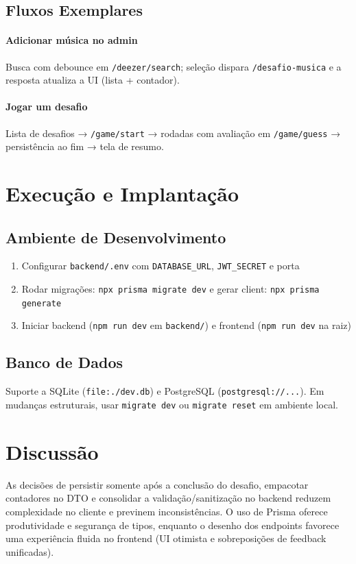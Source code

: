 \documentclass[12pt,a4paper]{article}
\begin{document}
\subsection{Fluxos Exemplares}
\paragraph{Adicionar música no admin} Busca com debounce em \texttt{/deezer/search}; seleção dispara \texttt{/desafio-musica} e a resposta atualiza a UI (lista + contador).

\paragraph{Jogar um desafio} Lista de desafios → \texttt{/game/start} → rodadas com avaliação em \texttt{/game/guess} → persistência ao fim → tela de resumo.

\section{Execução e Implantação}
\subsection{Ambiente de Desenvolvimento}
\begin{enumerate}
  \item Configurar \texttt{backend/.env} com \texttt{DATABASE\_URL}, \texttt{JWT\_SECRET} e porta
  \item Rodar migrações: \texttt{npx prisma migrate dev} e gerar client: \texttt{npx prisma generate}
  \item Iniciar backend (\texttt{npm run dev} em \texttt{backend/}) e frontend (\texttt{npm run dev} na raiz)
\end{enumerate}

\subsection{Banco de Dados}
Suporte a SQLite (\texttt{file:./dev.db}) e PostgreSQL (\texttt{postgresql://...}). Em mudanças estruturais, usar \texttt{migrate dev} ou \texttt{migrate reset} em ambiente local.

\section{Discussão}
As decisões de persistir somente após a conclusão do desafio, empacotar contadores no DTO e consolidar a validação/sanitização no backend reduzem complexidade no cliente e previnem inconsistências. O uso de Prisma oferece produtividade e segurança de tipos, enquanto o desenho dos endpoints favorece uma experiência fluida no frontend (UI otimista e sobreposições de feedback unificadas).
\end{document}
